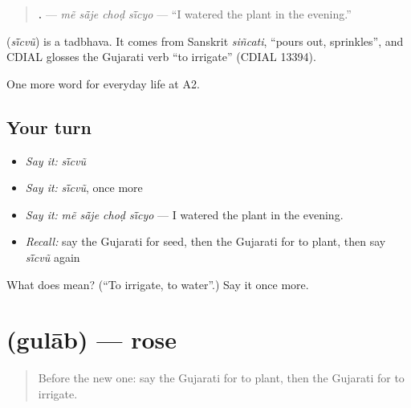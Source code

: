 \begin{quote}
\textbf{   .} — \emph{mẽ sā̃je choḍ sī̃cyo} — \textquotedblleft{}I watered the plant in the evening.\textquotedblright{}
\end{quote}

\begin{cousinweb}
\textbf{} (\emph{sī̃cvũ}) is a tadbhava. It comes from Sanskrit \emph{siñcati}, \textquotedblleft{}pours out, sprinkles\textquotedblright{}, and CDIAL glosses the Gujarati verb \textquotedblleft{}to irrigate\textquotedblright{} (CDIAL 13394).
\end{cousinweb}

\begin{grammarlens}[title={What you've built}]
One more word for everyday life at A2.
\end{grammarlens}

\subsection*{Your turn}
\begin{itemize}
\raggedright
  \item \emph{Say it:} \emph{sī̃cvũ}
  \item \emph{Say it:} \emph{sī̃cvũ}, once more
  \item \emph{Say it:} \emph{mẽ sā̃je choḍ sī̃cyo} — I watered the plant in the evening.
  \item \emph{Recall:} say the Gujarati for seed, then the Gujarati for to plant, then say \emph{sī̃cvũ} again
\end{itemize}

\begin{tcolorbox}[breakable,colback=teal!4,colframe=teal!35!black,title={Before you move on}]
What does  mean? (\textquotedblleft{}To irrigate, to water\textquotedblright{}.) Say it once more.
\end{tcolorbox}
\section[\texorpdfstring{\gu{ગુલાબ} (gulāb)}{ગુલાબ (gulāb)}]{ (gulāb) — rose}

\label{lesson:GU-C240-gulab}



\begin{quote}
Before the new one: say the Gujarati for to plant, then the Gujarati for to irrigate.
\end{quote}

